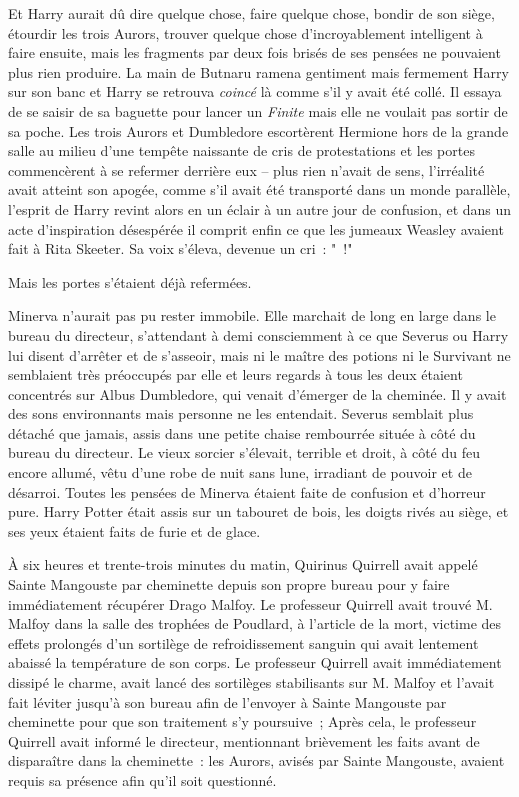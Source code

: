 Et Harry aurait dû dire quelque chose, faire quelque chose, bondir de son siège, étourdir les trois Aurors, trouver quelque chose d'incroyablement intelligent à faire ensuite, mais les fragments par deux fois brisés de ses pensées ne pouvaient plus rien produire. La main de Butnaru ramena gentiment mais fermement Harry sur son banc et Harry se retrouva \emph{coincé} là comme s'il y avait été collé. Il essaya de se saisir de sa baguette pour lancer un \emph{Finite} mais elle ne voulait pas sortir de sa poche. Les trois Aurors et Dumbledore escortèrent Hermione hors de la grande salle au milieu d'une tempête naissante de cris de protestations et les portes commencèrent à se refermer derrière eux -- plus rien n'avait de sens, l'irréalité avait atteint son apogée, comme s'il avait été transporté dans un monde parallèle, l'esprit de Harry revint alors en un éclair à un autre jour de confusion, et dans un acte d'inspiration désespérée il comprit enfin ce que les jumeaux Weasley avaient fait à Rita Skeeter. Sa voix s'éleva, devenue un cri~: "~!"

Mais les portes s'étaient déjà refermées.

\later

Minerva n'aurait pas pu rester immobile. Elle marchait de long en large dans le bureau du directeur, s'attendant à demi consciemment à ce que Severus ou Harry lui disent d'arrêter et de s'asseoir, mais ni le maître des potions ni le Survivant ne semblaient très préoccupés par elle et leurs regards à tous les deux étaient concentrés sur Albus Dumbledore, qui venait d'émerger de la cheminée. Il y avait des sons environnants mais personne ne les entendait. Severus semblait plus détaché que jamais, assis dans une petite chaise rembourrée située à côté du bureau du directeur. Le vieux sorcier s'élevait, terrible et droit, à côté du feu encore allumé, vêtu d'une robe de nuit sans lune, irradiant de pouvoir et de désarroi. Toutes les pensées de Minerva étaient faite de confusion et d'horreur pure. Harry Potter était assis sur un tabouret de bois, les doigts rivés au siège, et ses yeux étaient faits de furie et de glace.

À six heures et trente-trois minutes du matin, Quirinus Quirrell avait appelé Sainte Mangouste par cheminette depuis son propre bureau pour y faire immédiatement récupérer Drago Malfoy. Le professeur Quirrell avait trouvé M. Malfoy dans la salle des trophées de Poudlard, à l'article de la mort, victime des effets prolongés d'un sortilège de refroidissement sanguin qui avait lentement abaissé la température de son corps. Le professeur Quirrell avait immédiatement dissipé le charme, avait lancé des sortilèges stabilisants sur M. Malfoy et l'avait fait léviter jusqu'à son bureau afin de l'envoyer à Sainte Mangouste par cheminette pour que son traitement s'y poursuive~; Après cela, le professeur Quirrell avait informé le directeur, mentionnant brièvement les faits avant de disparaître dans la cheminette~: les Aurors, avisés par Sainte Mangouste, avaient requis sa présence afin qu'il soit questionné.

